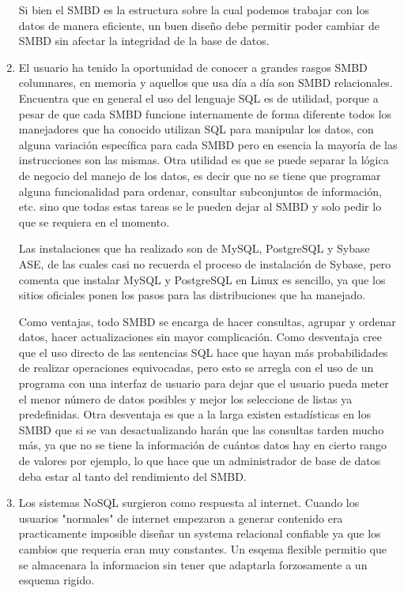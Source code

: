 \documentclass{exam}
\begin{document}
\begin{questions}
\begin{enumerate}[label=\alph*.]
	    Si bien el SMBD es la estructura sobre la cual podemos trabajar con los datos de manera eficiente, un buen diseño debe permitir poder cambiar de SMBD sin afectar la integridad de la base de datos.
	    

		\item El usuario ha tenido la oportunidad de conocer a grandes rasgos SMBD columnares, en memoria y aquellos que usa día a día son SMBD relacionales. Encuentra que en general el uso del lenguaje SQL es de utilidad, porque a pesar de que cada SMBD funcione internamente de forma diferente todos los manejadores que ha conocido utilizan SQL para manipular los datos, con alguna variación específica para cada SMBD pero en esencia la mayoría de las instrucciones son las mismas. Otra utilidad es que se puede separar la lógica de negocio del manejo de los datos, es decir que no se tiene que programar alguna funcionalidad para ordenar, consultar subconjuntos de información, etc. sino que todas estas tareas se le pueden dejar al SMBD y solo pedir lo que se requiera en el momento.
		
Las instalaciones que ha realizado son de MySQL, PostgreSQL y Sybase ASE, de las cuales casi no recuerda el proceso de instalación de Sybase, pero comenta que instalar MySQL y PostgreSQL en Linux es sencillo, ya que los sitios oficiales ponen los pasos para las distribuciones que ha manejado.

Como ventajas, todo SMBD se encarga de hacer consultas, agrupar y ordenar datos, hacer actualizaciones sin mayor complicación. Como desventaja cree que el uso directo de las sentencias SQL hace que hayan más probabilidades de realizar operaciones equivocadas, pero esto se arregla con el uso de un programa con una interfaz de usuario para dejar que el usuario pueda meter el menor número de datos posibles y mejor los seleccione de listas ya predefinidas. Otra desventaja es que a la larga existen estadísticas en los SMBD que si se van desactualizando harán que las consultas tarden mucho más, ya que no se tiene la información de cuántos datos hay en cierto rango de valores por ejemplo, lo que hace que un administrador de base de datos deba estar al tanto del rendimiento del SMBD.

		\item Los sistemas NoSQL surgieron como respuesta al internet. Cuando los usuarios "normales" de internet empezaron a generar contenido era practicamente imposible diseñar un systema relacional confiable ya que los cambios que requeria eran muy constantes. Un esqema flexible permitio que se almacenara la informacion sin tener que adaptarla forzosamente a un esquema rigido.
		

\end{enumerate}
\end{questions}
\end{document}
